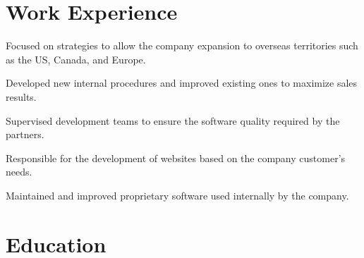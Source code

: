 \documentclass[]{deedy-resume-openfont}
\begin{document}
%
%


%
%

%
%

\begin{minipage}[t]{0.49\textwidth} 


\section{Work Experience}
\vspace{\topsep} %
\begin{tightemize}
\item Focused on strategies to allow the company expansion to overseas territories such as the US, Canada, and Europe.
\item Developed new internal procedures and improved existing ones to maximize sales results.
\item Supervised development teams to ensure the software quality required by the partners.
\end{tightemize}
\sectionsep

\begin{tightemize}
\item Responsible for the development of websites based on the company customer's needs.
\item Maintained and improved proprietary software used internally by the company.
\end{tightemize}
\sectionsep


\section{Education} 


\end{minipage}
\end{document}
